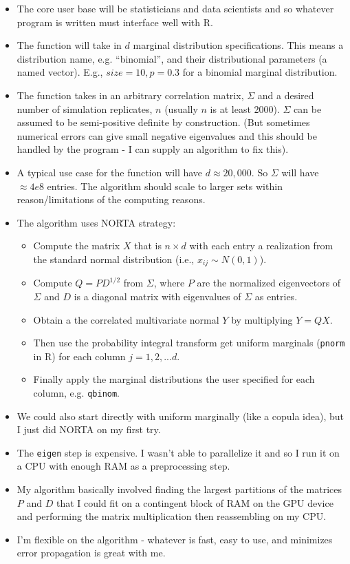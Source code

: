 \documentclass{article}
\begin{document}
\begin{itemize}
  \item The core user base will be statisticians and data scientists and so whatever program is written must interface well with R.
\item The function will take in $d$ marginal distribution specifications. This means a distribution name, e.g. ``binomial'', and their distributional parameters (a named vector). E.g., $size=10, p=0.3$ for a binomial marginal distribution.
\item The function takes in an arbitrary correlation matrix, $\Sigma$ and a desired number of simulation replicates, $n$ (usually $n$ is at least 2000). $\Sigma$ can be assumed to be semi-positive definite by construction. (But sometimes numerical errors can give small negative eigenvalues and this should be handled by the program - I can supply an algorithm to fix this).
\item A typical use case for the function will have $d \approx 20,000$. So $\Sigma$ will have $\approx 4e8$ entries. The algorithm should scale to larger sets within reason/limitations of the computing reasons.
\item The algorithm uses NORTA strategy:
  
\begin{itemize}
\item Compute the matrix $X$ that is $n \times d$ with each entry a realization from the standard normal distribution (i.e., $x_{ij} \sim N(0,1)$).
\item Compute $Q = PD^{1/2}$ from $\Sigma$, where $P$ are the normalized eigenvectors of $\Sigma$ and $D$ is a diagonal matrix with eigenvalues of $\Sigma$ as entries.
\item Obtain a the correlated multivariate normal $Y$ by multiplying $Y=QX$.
\item Then use the probability integral transform get uniform marginals (\texttt{pnorm} in R) for each column $j=1,2,...d$.
  \item Finally apply the marginal distributions the user specified for each column, e.g. \texttt{qbinom}.
\end{itemize}
\item We could also start directly with uniform marginally (like a copula idea), but I just did NORTA on my first try.
\item The \texttt{eigen} step is expensive. I wasn't able to parallelize it and so I run it on a CPU with enough RAM as a preprocessing step.
\item My algorithm basically involved finding the largest partitions of the matrices $P$ and $D$ that I could fit on a contingent block of RAM on the GPU device and performing the matrix multiplication then reassembling on my CPU.
\item I'm flexible on the algorithm - whatever is fast, easy to use, and minimizes error propagation is great with me.
\end{itemize}
\end{document}
